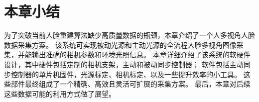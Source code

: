 \section*{本章小结}

为了突破当前人脸重建算法缺少高质量数据的瓶颈，本章介绍了一个人多视角人脸数据采集方案。
该系统可实现被动光源和主动光源的全流程人脸多视角图像采集，并能输出准确的相机参数和环境光照信息。
本章详细介绍了该系统的软硬件设计，其中硬件包括定制的相机支架，主动和被动同步控制器；
软件包括主动同步控制器的单片机固件，光源标定、相机标定、以及一些提升效率的小工具。
这些部件最终组成了一个精确、高效且灵活可扩展的采集方案。
最后，本章对后续这些数据可能的利用方式做了展望。
